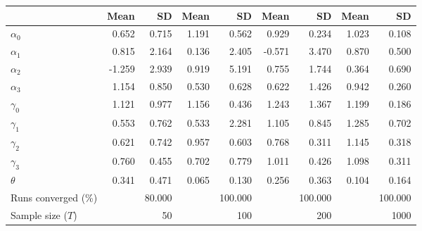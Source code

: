 
\begin{tabular}[t]{lrrrrrrrr}
\toprule
  & Mean & SD & Mean  & SD  & Mean   & SD   & Mean    & SD   \\
\midrule
$\alpha_{0}$ & 0.652 & 0.715 & 1.191 & 0.562 & 0.929 & 0.234 & 1.023 & 0.108\\
$\alpha_{1}$ & 0.815 & 2.164 & 0.136 & 2.405 & -0.571 & 3.470 & 0.870 & 0.500\\
$\alpha_{2}$ & -1.259 & 2.939 & 0.919 & 5.191 & 0.755 & 1.744 & 0.364 & 0.690\\
$\alpha_{3}$ & 1.154 & 0.850 & 0.530 & 0.628 & 0.622 & 1.426 & 0.942 & 0.260\\
$\gamma_{0}$ & 1.121 & 0.977 & 1.156 & 0.436 & 1.243 & 1.367 & 1.199 & 0.186\\
$\gamma_{1}$ & 0.553 & 0.762 & 0.533 & 2.281 & 1.105 & 0.845 & 1.285 & 0.702\\
$\gamma_{2}$ & 0.621 & 0.742 & 0.957 & 0.603 & 0.768 & 0.311 & 1.145 & 0.318\\
$\gamma_{3}$ & 0.760 & 0.455 & 0.702 & 0.779 & 1.011 & 0.426 & 1.098 & 0.311\\
$\theta$ & 0.341 & 0.471 & 0.065 & 0.130 & 0.256 & 0.363 & 0.104 & 0.164\\
Runs converged (\%) &  & 80.000 &  & 100.000 &  & 100.000 &  & 100.000\\
Sample size ($T$) &  & 50 &  & 100 &  & 200 &  & 1000\\
\bottomrule
\end{tabular}
